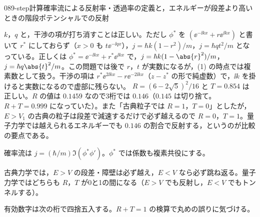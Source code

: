 \documentclass[uplatex,dvipdfmx,a4paper,11pt]{jsarticle}
\begin{document}
\begin{mondai}{089-step}{計算}{確率流による反射率・透過率の定義と，エネルギーが段差より高いときの階段ポテンシャルでの反射}
\begin{kotaeran}
   $k$，$q$ と，干渉の項が打ち消すことは正しい。ただし $\phi^{*}$ を $(\ee^{-\ii kx}+r\ee^{\ii kx})$ と書いて $r^{*}$ にしておらず（$x>0$ も $t\ee^{-\ii qx}$），$j=\hbar k(1-r^{2})/m$，$j=\hbar q t^{2}/m$ となっている。正しくは $\phi^{*}=\ee^{-\ii kx}+r^{*}\ee^{\ii kx}$ で，$j=\hbar k(1-\abs{r}^{2})/m$，$j=\hbar q\abs{t}^{2}/m$。この問題では後で $r$，$t$ が実数になるが，(1) の時点では複素数として扱う。干渉の項は $r^{*}\ee^{2\ii kx}-r\ee^{-2\ii kx}$（$z-z^{*}$ の形で純虚数）で，$\ii k$ を掛けると実数になるので虚部に残らない。
   $R=(6-2\sqrt{5})^{2}/16$ と $T=\num{0.854}$ は正しい。$R$ の値は $\num{0.1459}$ なので3桁では $\num{0.146}$（$\num{0.145}$ は切り捨て。$R+T=\num{0.999}$ になっていた）。また「古典粒子では $R=1$，$T=0$」としたが，$E>V_{1}$ の古典の粒子は段差で減速するだけで必ず越えるので $R=0$，$T=1$。量子力学では越えられるエネルギーでも $\num{0.146}$ の割合で反射する，というのが比較の要点である。
\end{kotaeran}
\begin{rikai}
  \item 確率流は $j=(\hbar/m)\Im(\phi^{*}\phi')$。$\phi^{*}$ では係数も複素共役にする。
  \item 古典力学では，$E>V$ の段差・障壁は必ず越え，$E<V$ なら必ず跳ね返る。量子力学ではどちらも $R$，$T$ が0と1の間になる（$E>V$ でも反射し，$E<V$ でもトンネルする）。
  \item 有効数字は次の桁で四捨五入する。$R+T=1$ の検算で丸めの誤りに気づける。
\end{rikai}
\end{mondai}
\end{document}
